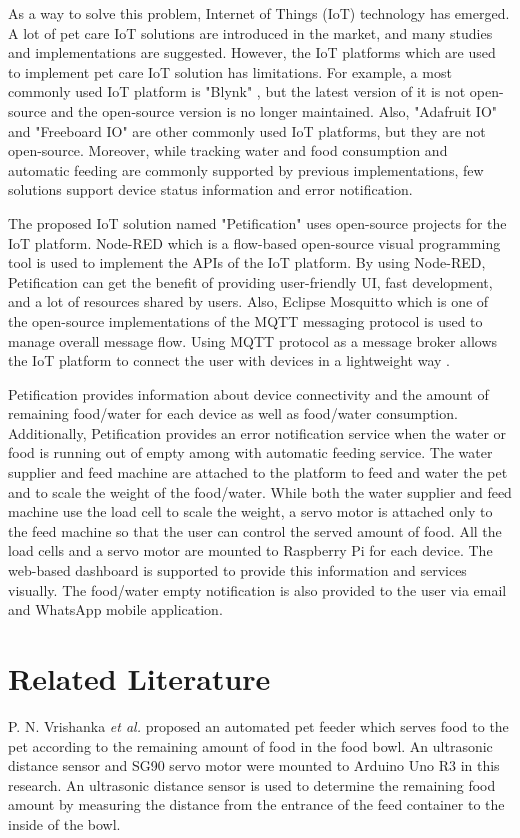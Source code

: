 \documentclass[conference]{IEEEtran}
\begin{document}
As a way to solve this problem, Internet of Things (IoT) technology has emerged.
A lot of pet care IoT solutions are introduced in the market, and many studies and implementations are suggested.
However, the IoT platforms which are used to implement pet care IoT solution has limitations.
For example, a most commonly used IoT platform is "Blynk" \cite{b2, b3, b4, b5}, but the latest version of it is not open-source and the open-source version is no longer maintained.
Also, "Adafruit IO" \cite{b6} and "Freeboard IO" \cite{b7} are other commonly used IoT platforms, but they are not open-source.
Moreover, while tracking water and food consumption and automatic feeding are commonly supported by previous implementations, few solutions support device status information and error notification.

The proposed IoT solution named "Petification" uses open-source projects for the IoT platform.
Node-RED which is a flow-based open-source visual programming tool \cite{b8} is used to implement the APIs of the IoT platform.
By using Node-RED, Petification can get the benefit of providing user-friendly UI, fast development, and a lot of resources shared by users.
Also, Eclipse Mosquitto which is one of the open-source implementations of the MQTT messaging protocol is used to manage overall message flow.
Using MQTT protocol as a message broker allows the IoT platform to connect the user with devices in a lightweight way \cite{b9}.

Petification provides information about device connectivity and the amount of remaining food/water for each device as well as food/water consumption.
Additionally, Petification provides an error notification service when the water or food is running out of empty among with automatic feeding service.
The water supplier and feed machine are attached to the platform to feed and water the pet and to scale the weight of the food/water.
While both the water supplier and feed machine use the load cell to scale the weight, a servo motor is attached only to the feed machine so that the user can control the served amount of food.
All the load cells and a servo motor are mounted to Raspberry Pi for each device.
The web-based dashboard is supported to provide this information and services visually.
The food/water empty notification is also provided to the user via email and WhatsApp mobile application.

\section{Related Literature}
P. N. Vrishanka \textit{et al.} \cite{b10} proposed an automated pet feeder which serves food to the pet according to the remaining amount of food in the food bowl.
An ultrasonic distance sensor and SG90 servo motor were mounted to Arduino Uno R3 in this research.
An ultrasonic distance sensor is used to determine the remaining food amount by measuring the distance from the entrance of the feed container to the inside of the bowl.
\end{document}
